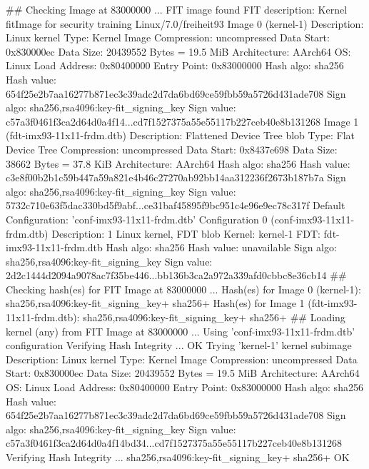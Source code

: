 \begin{bashinput}
## Checking Image at 83000000 ...
   FIT image found
   FIT description: Kernel fitImage for security training Linux/7.0/freiheit93
    Image 0 (kernel-1)
     Description:  Linux kernel
     Type:         Kernel Image
     Compression:  uncompressed
     Data Start:   0x830000ec
     Data Size:    20439552 Bytes = 19.5 MiB
     Architecture: AArch64
     OS:           Linux
     Load Address: 0x80400000
     Entry Point:  0x83000000
     Hash algo:    sha256
     Hash value:   654f25e2b7aa16277b871ec3c39adc2d7da6bd69ce59fbb59a5726d431ade708
     Sign algo:    sha256,rsa4096:key-fit_signing_key
     Sign value:   c57a3f0461f3ca2d64d0a4f14...cd7f1527375a55e55117b227ceb40e8b131268
    Image 1 (fdt-imx93-11x11-frdm.dtb)
     Description:  Flattened Device Tree blob
     Type:         Flat Device Tree
     Compression:  uncompressed
     Data Start:   0x8437e698
     Data Size:    38662 Bytes = 37.8 KiB
     Architecture: AArch64
     Hash algo:    sha256
     Hash value:   c3e8f00b2b1c59b447a59a821e4b46c27270ab92bb14aa312236f2673b187b7a
     Sign algo:    sha256,rsa4096:key-fit_signing_key
     Sign value:   5732c710e63f5dac330bd5f9abf...ce31baf45895f9bc951c4e96e9ec78c317f
    Default Configuration: 'conf-imx93-11x11-frdm.dtb'
    Configuration 0 (conf-imx93-11x11-frdm.dtb)
     Description:  1 Linux kernel, FDT blob
     Kernel:       kernel-1
     FDT:          fdt-imx93-11x11-frdm.dtb
     Hash algo:    sha256
     Hash value:   unavailable
     Sign algo:    sha256,rsa4096:key-fit_signing_key
     Sign value:   2d2c1444d2094a9078ac7f35be446...bb136b3ca2a972a339afd0cbbc8e36cb14
## Checking hash(es) for FIT Image at 83000000 ...
   Hash(es) for Image 0 (kernel-1): sha256,rsa4096:key-fit_signing_key+ sha256+ 
   Hash(es) for Image 1 (fdt-imx93-11x11-frdm.dtb): sha256,rsa4096:key-fit_signing_key+ sha256+ 
## Loading kernel (any) from FIT Image at 83000000 ...
   Using 'conf-imx93-11x11-frdm.dtb' configuration
   Verifying Hash Integrity ... OK
   Trying 'kernel-1' kernel subimage
     Description:  Linux kernel
     Type:         Kernel Image
     Compression:  uncompressed
     Data Start:   0x830000ec
     Data Size:    20439552 Bytes = 19.5 MiB
     Architecture: AArch64
     OS:           Linux
     Load Address: 0x80400000
     Entry Point:  0x83000000
     Hash algo:    sha256
     Hash value:   654f25e2b7aa16277b871ec3c39adc2d7da6bd69ce59fbb59a5726d431ade708
     Sign algo:    sha256,rsa4096:key-fit_signing_key
     Sign value:   c57a3f0461f3ca2d64d0a4f14bd34...cd7f1527375a55e55117b227ceb40e8b131268
   Verifying Hash Integrity ... sha256,rsa4096:key-fit_signing_key+ sha256+ OK
\end{bashinput}
